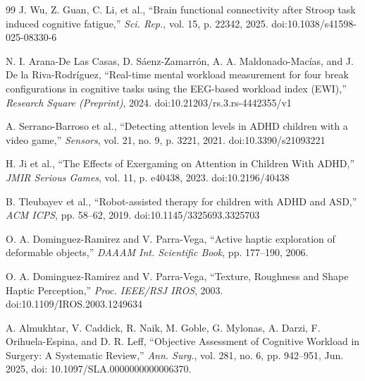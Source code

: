 \documentclass[conference]{IEEEtran}
\begin{document}
\begin{thebibliography}{99}
J. Wu, Z. Guan, C. Li, et al., ``Brain functional connectivity after Stroop task induced cognitive fatigue,'' \emph{Sci. Rep.}, vol. 15, p. 22342, 2025. doi:10.1038/s41598-025-08330-6

N. I. Arana-De Las Casas, D. Sáenz-Zamarrón, A. A. Maldonado-Macías, and J. De la Riva-Rodríguez, ``Real-time mental workload measurement for four break configurations in cognitive tasks using the EEG-based workload index (EWI),'' \emph{Research Square (Preprint)}, 2024. doi:10.21203/rs.3.rs-4442355/v1

A. Serrano-Barroso et al., ``Detecting attention levels in ADHD children with a video game,'' \emph{Sensors}, vol. 21, no. 9, p. 3221, 2021. doi:10.3390/s21093221

H. Ji et al., ``The Effects of Exergaming on Attention in Children With ADHD,'' \emph{JMIR Serious Games}, vol. 11, p. e40438, 2023. doi:10.2196/40438

B. Tleubayev et al., ``Robot-assisted therapy for children with ADHD and ASD,'' \emph{ACM ICPS}, pp. 58–62, 2019. doi:10.1145/3325693.3325703

O. A. Dominguez-Ramirez and V. Parra-Vega, ``Active haptic exploration of deformable objects,'' \emph{DAAAM Int. Scientific Book}, pp. 177–190, 2006.

O. A. Dominguez-Ramirez and V. Parra-Vega, ``Texture, Roughness and Shape Haptic Perception,'' \emph{Proc. IEEE/RSJ IROS}, 2003. doi:10.1109/IROS.2003.1249634

A. Almukhtar, V. Caddick, R. Naik, M. Goble, G. Mylonas, A. Darzi, 
F. Orihuela-Espina, and D. R. Leff, 
``Objective Assessment of Cognitive Workload in Surgery: A Systematic Review,'' 
\emph{Ann. Surg.}, vol. 281, no. 6, pp. 942--951, Jun. 2025, 
doi: 10.1097/SLA.0000000000006370.


\end{thebibliography}
\end{document}
